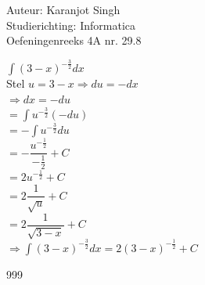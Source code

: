 \documentclass[a4paper]{article}
\begin{document}
\noindent \large Auteur: Karanjot Singh \\
\noindent \large Studierichting: Informatica \\
\noindent \large Oefeningenreeks 4A nr. 29.8 \\

\normalsize

$\displaystyle\int (3 - x)^{-\tfrac{3}{2}} dx$ \\

Stel $u = 3 - x \Rightarrow du = -dx$ \\

$\Rightarrow dx = -du$ \\

$= \displaystyle\int u^{-\tfrac{3}{2}} (-du)$ \\

$= -\displaystyle\int u^{-\tfrac{3}{2}} du$ \\

$= -\dfrac{u^{-\tfrac{1}{2}}}{-\tfrac{1}{2}} + C$ \\

$= 2u^{-\tfrac{1}{2}} + C$ \\

$= 2\dfrac{1}{\sqrt{u}} + C$ \\

$= 2\dfrac{1}{\sqrt{3 - x}} + C$ \\

$\Rightarrow \displaystyle\int (3 - x)^{-\tfrac{3}{2}} dx = 2(3 - x)^{-\tfrac{1}{2}} + C$ \\

\begin{thebibliography}{999}
\end{thebibliography}
\end{document}
